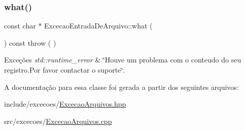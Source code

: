 \subsubsection{\texorpdfstring{what()}{what()}}
{\footnotesize\ttfamily const char $\ast$ Excecao\+Entrada\+De\+Arquivo\+::what (\begin{DoxyParamCaption}{ }\end{DoxyParamCaption}) const throw ( ) \hspace{0.3cm}{\ttfamily [virtual]}}


\begin{DoxyExceptions}{Exceções}
{\em std\+::runtime\+\_\+error} & \char`\"{}\+Houve um problema com o conteudo do seu registro.\+Por favor contactar o suporte\char`\"{}. \\
\hline
\end{DoxyExceptions}


A documentação para essa classe foi gerada a partir dos seguintes arquivos\+:\begin{DoxyCompactItemize}
\item 
include/excecoes/\mbox{\hyperlink{_excecao_arquivos_8hpp}{Excecao\+Arquivos.\+hpp}}\item 
src/excecoes/\mbox{\hyperlink{_excecao_arquivos_8cpp}{Excecao\+Arquivos.\+cpp}}\end{DoxyCompactItemize}

